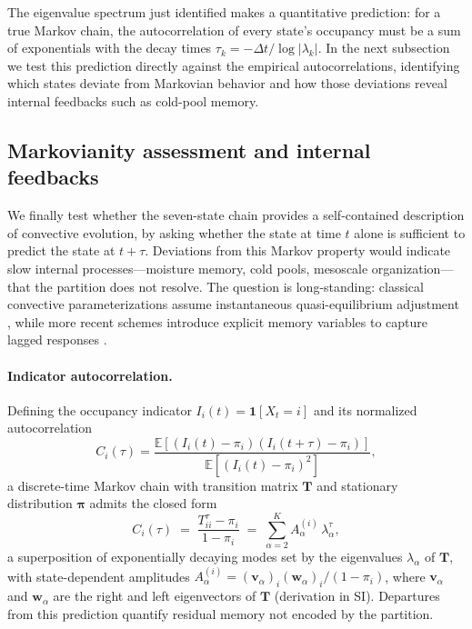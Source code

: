 \documentclass[11pt]{article}
\begin{document}
The eigenvalue spectrum just identified makes a quantitative prediction: for a true Markov chain, the autocorrelation of every state's occupancy must be a sum of exponentials with the decay times $\tau_k = -\Delta t / \log|\lambda_k|$. In the next subsection we test this prediction directly against the empirical autocorrelations, identifying which states deviate from Markovian behavior and how those deviations reveal internal feedbacks such as cold-pool memory.


\subsection{Markovianity assessment and internal feedbacks}\label{sec:markov}

We finally test whether the seven-state chain provides a self-contained description of convective evolution, by asking whether the state at time $t$ alone is sufficient to predict the state at $t+\tau$. Deviations from this Markov property would indicate slow internal processes---moisture memory, cold pools, mesoscale organization---that the partition does not resolve. The question is long-standing: classical convective parameterizations assume instantaneous quasi-equilibrium adjustment \citep{zhang2003convective, bechtold2014representing}, while more recent schemes introduce explicit memory variables to capture lagged responses \citep{piriou2007approach, gerard2009cloud, mapes2011parameterizing, hwong2023assessing}.

\paragraph{Indicator autocorrelation.}
Defining the occupancy indicator $I_i(t) = \mathbf{1}[X_t = i]$ and its normalized autocorrelation
\begin{equation}
C_i(\tau) =
\frac{\mathbb{E}\!\left[(I_i(t)-\pi_i)(I_i(t+\tau)-\pi_i)\right]}
     {\mathbb{E}\!\left[(I_i(t)-\pi_i)^2\right]},
\end{equation}
a discrete-time Markov chain with transition matrix $\mathbf{T}$ and stationary distribution $\boldsymbol{\pi}$ admits the closed form
\begin{equation}
C_i(\tau) \;=\; \frac{T^\tau_{ii} - \pi_i}{1-\pi_i}
\;=\; \sum_{\alpha=2}^K A_\alpha^{(i)}\, \lambda_\alpha^\tau,
\label{eq:autocor}
\end{equation}
a superposition of exponentially decaying modes set by the eigenvalues $\lambda_\alpha$ of $\mathbf{T}$, with state-dependent amplitudes $A_\alpha^{(i)} = (\mathbf{v}_\alpha)_i (\mathbf{w}_\alpha)_i / (1-\pi_i)$, where $\mathbf{v}_\alpha$ and $\mathbf{w}_\alpha$ are the right and left eigenvectors of $\mathbf{T}$ (derivation in SI). Departures from this prediction quantify residual memory not encoded by the partition.
\end{document}
